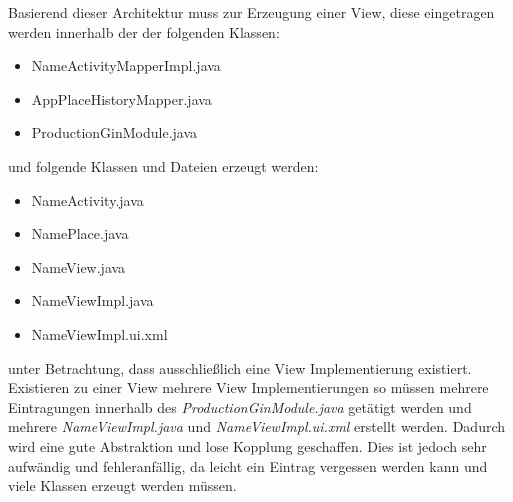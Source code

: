 Basierend dieser Architektur muss zur Erzeugung einer View, diese eingetragen
werden innerhalb der der folgenden Klassen:
    \begin{itemize}
    \item \grqq{}Name\grqq{}ActivityMapperImpl.java
    \item AppPlaceHistoryMapper.java
    \item ProductionGinModule.java
  \end{itemize} 
und folgende Klassen und Dateien erzeugt werden:
   \begin{itemize}
    	\item \grqq{}Name\grqq{}Activity.java
    	\item \grqq{}Name\grqq{}Place.java
    	\item \grqq{}Name\grqq{}View.java
    	\item \grqq{}Name\grqq{}ViewImpl.java
    	\item \grqq{}Name\grqq{}ViewImpl.ui.xml
  \end{itemize} 
unter Betrachtung, dass ausschließlich eine View Implementierung existiert.
Existieren zu einer View mehrere View Implementierungen so müssen mehrere
Eintragungen innerhalb des \textit{ProductionGinModule.java} getätigt werden und
mehrere \textit{\grqq{}Name\grqq{}ViewImpl.java} und
\textit{\grqq{}Name\grqq{}ViewImpl.ui.xml} erstellt werden. Dadurch wird eine
gute Abstraktion und lose Kopplung geschaffen. Dies ist jedoch sehr
aufwändig und fehleranfällig, da leicht ein Eintrag vergessen werden kann und
viele Klassen erzeugt werden müssen.

